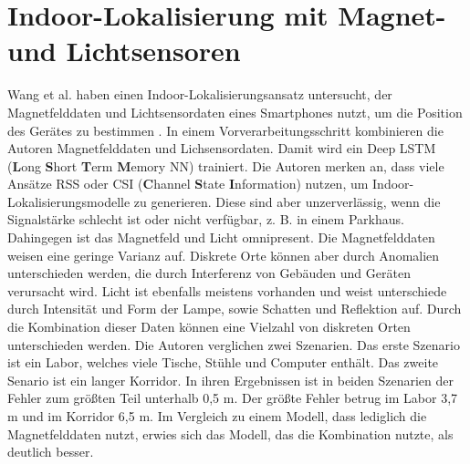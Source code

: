 \section{Indoor-Lokalisierung mit Magnet- und Lichtsensoren}
Wang et al. haben einen Indoor-Lokalisierungsansatz untersucht, der Magnetfelddaten und
Lichtsensordaten eines Smartphones nutzt, um die Position des Gerätes zu bestimmen \cite{wang2018deepml}.
In einem Vorverarbeitungsschritt kombinieren die Autoren Magnetfelddaten und Lichsensordaten.
Damit wird ein Deep LSTM (\textbf{L}ong  \textbf{S}hort \textbf{T}erm \textbf{M}emory NN) trainiert.
\newline
\newline
Die Autoren merken an, dass viele Ansätze RSS oder CSI (\textbf{C}hannel \textbf{S}tate \textbf{I}nformation) nutzen, um Indoor-Lokalisierungsmodelle zu generieren.
Diese sind aber unzerverlässig, wenn die Signalstärke schlecht ist oder nicht verfügbar, z. B. in einem Parkhaus.
Dahingegen ist das Magnetfeld und Licht omnipresent.
Die Magnetfelddaten weisen eine geringe Varianz auf.
Diskrete Orte können aber durch Anomalien unterschieden werden, die durch Interferenz von Gebäuden und Geräten verursacht wird.
Licht ist ebenfalls meistens vorhanden und weist unterschiede durch Intensität und Form der Lampe, sowie Schatten und Reflektion auf.
Durch die Kombination dieser Daten können eine Vielzahl von diskreten Orten unterschieden werden.
\newline
\newline
Die Autoren verglichen zwei Szenarien.
Das erste Szenario ist ein Labor, welches viele Tische, Stühle und Computer enthält.
Das zweite Senario ist ein langer Korridor.
In ihren Ergebnissen ist in beiden Szenarien der Fehler zum größten Teil unterhalb 0,5 m.
Der größte Fehler betrug im Labor 3,7 m und im Korridor 6,5 m.
Im Vergleich zu einem Modell, dass lediglich die Magnetfelddaten nutzt, erwies sich das Modell, das die Kombination nutzte, als deutlich besser.